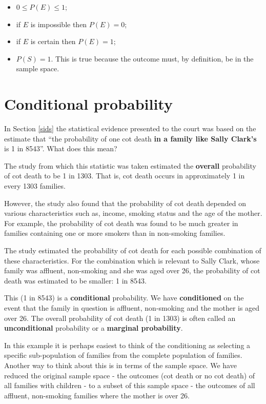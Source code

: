 \documentclass[
  british,
  11pt,
  openany, a4paper]{book}
\providecommand{\tightlist}{%
  \setlength{\itemsep}{0pt}\setlength{\parskip}{0pt}}
\begin{document}
\begin{itemize}
\tightlist
\item
  \(0 \leq P(E) \leq 1\);
\item
  if \(E\) is impossible then \(P(E)=0\);
\item
  if \(E\) is certain then \(P(E)=1\);
\item
  \(P(S)=1\). This is true because the outcome must, by definition, be in the sample space.
\end{itemize}

\section{Conditional probability}\label{conditional-probability}

In Section \ref{sids} the statistical evidence presented to the court was based on the estimate that ``the probability of one cot death \textbf{in a family like Sally Clark's} is 1 in 8543''. What does this mean?

The study from which this statistic was taken estimated the \textbf{overall} probability of cot death to be 1 in 1303. That is, cot death occurs in approximately 1 in every 1303 families.

However, the study also found that the probability of cot death depended on various characteristics such as, income, smoking status and the age of the mother. For example, the probability of cot death was found to be much greater in families containing one or more smokers than in non-smoking families.

The study estimated the probability of cot death for each possible combination of these characteristics. For the combination which is relevant to Sally Clark, whose family was affluent, non-smoking and she was aged over 26, the probability of cot death was estimated to be smaller: 1 in 8543.

This (1 in 8543) is a \textbf{conditional} probability. We have \textbf{conditioned} on the event that the family in question is affluent, non-smoking and the mother is aged over 26. The overall probability of cot death (1 in 1303) is often called an \textbf{unconditional} probability or a \textbf{marginal probability}.

In this example it is perhaps easiest to think of the conditioning as selecting a specific sub-population of families from the complete population of families. Another way to think about this is in terms of the sample space. We have reduced the original sample space - the outcomes (cot death or no cot death) of all families with children - to a subset of this sample space - the outcomes of all affluent, non-smoking families where the mother is over 26.
\end{document}
